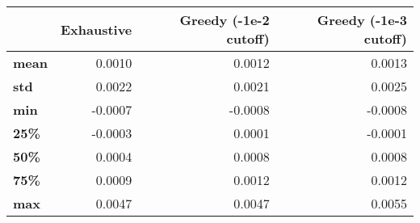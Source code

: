 \begin{tabular}{lrrr}
\toprule
{} &  Exhaustive &  Greedy (-1e-2 cutoff) &  Greedy (-1e-3 cutoff) \\
\midrule
\textbf{mean} &      0.0010 &                 0.0012 &                 0.0013 \\
\textbf{std } &      0.0022 &                 0.0021 &                 0.0025 \\
\textbf{min } &     -0.0007 &                -0.0008 &                -0.0008 \\
\textbf{25\% } &     -0.0003 &                 0.0001 &                -0.0001 \\
\textbf{50\% } &      0.0004 &                 0.0008 &                 0.0008 \\
\textbf{75\% } &      0.0009 &                 0.0012 &                 0.0012 \\
\textbf{max } &      0.0047 &                 0.0047 &                 0.0055 \\
\bottomrule
\end{tabular}
